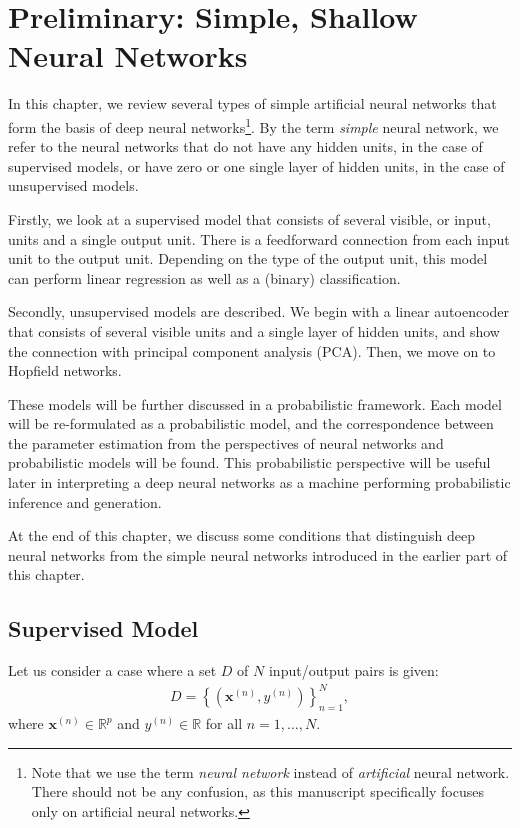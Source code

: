 \documentclass{now}
\newcommand{\vect}[1]{\mathbf{#1}}
\newcommand{\vx}[0]{\vect{x}}
\newcommand{\RR}[0]{\mathbb{R}}
\begin{document}
\chapter{Preliminary: Simple, Shallow Neural Networks}
\label{chapter:simple_neural_networks}

In this chapter, we review several types of simple artificial neural networks
that form the basis of deep neural networks\footnote{Note that we use the term
    \textit{neural network} instead of \textit{artificial} neural network.
    There should not be any confusion, as this manuscript specifically focuses only
on artificial neural networks.}. By the term \textit{simple} neural network, we
refer to the neural networks that do not have any hidden units, in the case of
supervised models, or have zero or one single layer of hidden units, in the
case of unsupervised models.

Firstly, we look at a supervised model that consists of several visible, or
input, units and a single output unit. There is a feedforward connection from
each input unit to the output unit.  Depending on the type of the output unit,
this model can perform linear regression as well as a (binary) classification.

Secondly, unsupervised models are described. We begin with a linear autoencoder
that consists of several visible units and a single layer of hidden units, and
show the connection with principal component analysis (PCA). Then, we move on
to Hopfield networks.

These models will be further discussed in a probabilistic framework.  Each
model will be re-formulated as a probabilistic model, and the correspondence
between the parameter estimation from the perspectives of neural networks and
probabilistic models will be found. This probabilistic perspective will be
useful later in interpreting a deep neural networks as a machine performing
probabilistic inference and generation.

At the end of this chapter, we discuss some conditions that distinguish deep
neural networks from the simple neural networks introduced in the earlier part
of this chapter.

\section{Supervised Model}
\label{sec:supervised_model}

Let us consider a case where a set $D$ of $N$ input/output pairs is given:
\begin{align}
    \label{eq:set_disc}
    D=\left\{ \left( \vx^{(n)}, y^{(n)} \right) \right\}_{n=1}^N,
\end{align}
where $\vx^{(n)} \in \RR^p$ and $y^{(n)} \in \RR$ for all $n=1,\dots,N$.
\end{document}
